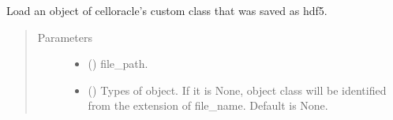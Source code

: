 \documentclass[letterpaper,10pt,english]{sphinxmanual}
\begin{document}
\begin{fulllineitems}
\label{\detokenize{modules/celloracle:celloracle.load_hdf5}}
Load an object of celloracle’s custom class that was saved as hdf5.
\begin{quote}\begin{description}
\item[{Parameters}] \leavevmode\begin{itemize}
\item {} 
 () \textendash{} file\_path.

\item {} 
 () \textendash{} Types of object.
If it is None, object class will be identified from the extension of file\_name.
Default is None.

\end{itemize}

\end{description}\end{quote}

\end{fulllineitems}
\end{document}
